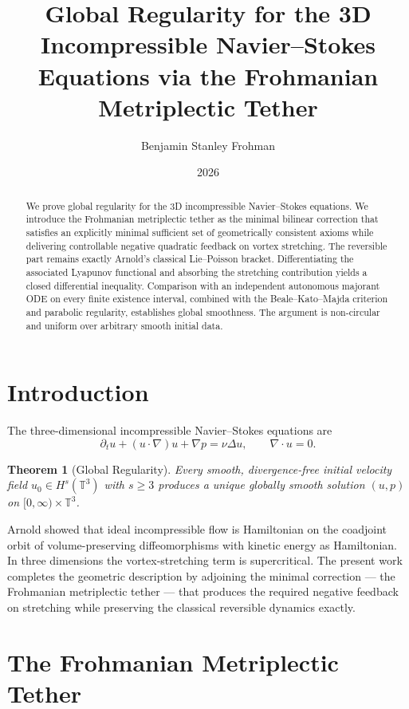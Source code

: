 \documentclass[11pt,a4paper]{article}
\title{\textbf{Global Regularity for the 3D Incompressible Navier--Stokes Equations via the Frohmanian Metriplectic Tether}}
\author{Benjamin Stanley Frohman}
\date{2026}
\newtheorem{theorem}{Theorem}[section]
\begin{document}
\maketitle

\begin{abstract}
We prove global regularity for the 3D incompressible Navier--Stokes equations. We introduce the Frohmanian metriplectic tether as the minimal bilinear correction that satisfies an explicitly minimal sufficient set of geometrically consistent axioms while delivering controllable negative quadratic feedback on vortex stretching. The reversible part remains exactly Arnold’s classical Lie--Poisson bracket. Differentiating the associated Lyapunov functional and absorbing the stretching contribution yields a closed differential inequality. Comparison with an independent autonomous majorant ODE on every finite existence interval, combined with the Beale--Kato--Majda criterion and parabolic regularity, establishes global smoothness. The argument is non-circular and uniform over arbitrary smooth initial data.
\end{abstract}

\section{Introduction}

The three-dimensional incompressible Navier--Stokes equations are
\begin{equation}
\partial_t u + (u \cdot \nabla) u + \nabla p = \nu \Delta u, \qquad \nabla \cdot u = 0.
\end{equation}

\begin{theorem}[Global Regularity]
Every smooth, divergence-free initial velocity field \( u_0 \in H^s(\mathbb{T}^3) \) with \( s \geq 3 \) produces a unique globally smooth solution \( (u, p) \) on \( [0, \infty) \times \mathbb{T}^3 \).
\end{theorem}

Arnold showed that ideal incompressible flow is Hamiltonian on the coadjoint orbit of volume-preserving diffeomorphisms with kinetic energy as Hamiltonian. In three dimensions the vortex-stretching term is supercritical. The present work completes the geometric description by adjoining the minimal correction — the Frohmanian metriplectic tether — that produces the required negative feedback on stretching while preserving the classical reversible dynamics exactly.

\section{The Frohmanian Metriplectic Tether}
\end{document}
